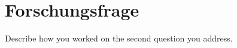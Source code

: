 \section{Forschungsfrage} \label{forschungsfrage} %

Describe how you worked on the second question you address.

\blindtext
